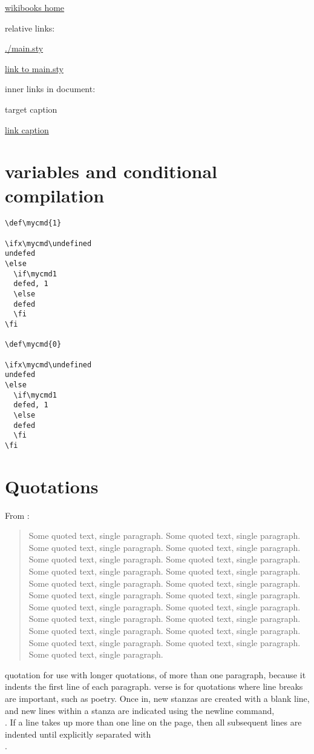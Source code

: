 \documentclass[12pt]{article}
\begin{document}
\href{http://www.wikibooks.org}{wikibooks home}

relative links:

\url{./main.sty}

\href{./main.sty}{link to main.sty}

inner links in document:

\hypertarget{label}{target caption}

\hyperlink{label}{link caption}

\section{variables and conditional compilation}

\begin{lstlisting}
\def\mycmd{1}

\ifx\mycmd\undefined
undefed
\else
  \if\mycmd1
  defed, 1
  \else
  defed
  \fi
\fi

\def\mycmd{0}

\ifx\mycmd\undefined
undefed
\else
  \if\mycmd1
  defed, 1
  \else
  defed
  \fi
\fi
\end{lstlisting}

\section{Quotations}\label{quotations}

From \cite{Aa00}:
\begin{quote}
Some quoted text, single paragraph. Some quoted text, single paragraph. Some quoted text, single paragraph. 
Some quoted text, single paragraph. Some quoted text, single paragraph. Some quoted text, single paragraph. 
Some quoted text, single paragraph. Some quoted text, single paragraph. Some quoted text, single paragraph. 
Some quoted text, single paragraph. Some quoted text, single paragraph. Some quoted text, single paragraph. 
Some quoted text, single paragraph. Some quoted text, single paragraph. Some quoted text, single paragraph. 
Some quoted text, single paragraph. Some quoted text, single paragraph. Some quoted text, single paragraph. 
Some quoted text, single paragraph. Some quoted text, single paragraph. Some quoted text, single paragraph. 
\end{quote}

quotation
    for use with longer quotations, of more than one paragraph, because it indents the first line of each paragraph.
verse
    is for quotations where line breaks are important, such as poetry. Once in, new stanzas are created with a blank line, and new lines within a stanza are indicated using the newline command, \\. If a line takes up more than one line on the page, then all subsequent lines are indented until explicitly separated with \\. 
\end{document}
